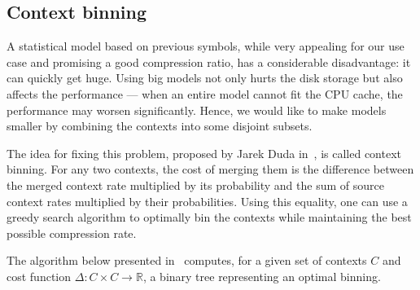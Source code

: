 \subsection{Context binning}\label{subsec:context-binning}

A statistical model based on previous symbols, while very appealing for our
use case and promising a good compression ratio, has a considerable
disadvantage: it can quickly get huge.
Using big models not only hurts the disk storage but also affects the
performance --- when an entire model cannot fit the CPU cache, the performance
may worsen significantly.
Hence, we would like to make models smaller by combining the contexts into
some disjoint subsets.

The idea for fixing this problem, proposed by Jarek Duda
in~\cite{https://doi.org/10.48550/arxiv.2201.05028}, is called context binning.
For any two contexts, the cost of merging them is the difference between the
merged context rate multiplied by its probability and the sum of source
context rates multiplied by their probabilities.
Using this equality, one can use a greedy search algorithm to optimally bin
the contexts while maintaining the best possible compression rate.

The algorithm below presented in~\cite{https://doi.org/10.48550/arxiv.2201.05028} computes, for a given set of
contexts $C$ and cost function $\Delta: C \times C \rightarrow \mathbb{R}$,
a binary tree representing an optimal binning.


